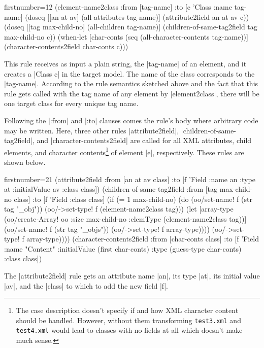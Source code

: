 \documentclass[submission]{eptcs}
\newcommand{\code}{\clojureinline}
\begin{document}
\begin{clojurecode*}{firstnumber=12}
  (element-name2class
   :from [tag-name]
   :to   [c 'Class {:name tag-name}]
   (doseq [[an at av] (all-attributes tag-name)]
     (attribute2field an at av c))
   (doseq [[tag max-child-no] (all-children tag-name)]
     (children-of-same-tag2field tag max-child-no c))
   (when-let [char-conts (seq (all-character-contents tag-name))]
     (character-contents2field char-conts c)))
\end{clojurecode*}

This rule receives as input a plain string, the \code|tag-name| of an element,
and it creates a \code|Class c| in the target model.  The name of the class
corresponds to the \code|tag-name|.  According to the rule semantics sketched
above and the fact that this rule gets called with the tag name of any element
by \code|element2class|, there will be one target class for every unique tag
name.

Following the \code|:from| and \code|:to| clauses comes the rule's body where
arbitrary code may be written.  Here, three other rules \code|attribute2field|,
\code|children-of-same-tag2field|, and \code|character-contents2field| are
called for all XML attributes, child elements, and character
contents\footnote{The case description doesn't specify if and how XML character
  content should be handled.  However, without them transforming
  \texttt{test3.xml} and \texttt{test4.xml} would lead to classes with no
  fields at all which doesn't make much sense.}  of element \code|e|,
respectively.  These rules are shown below.

\begin{clojurecode*}{firstnumber=21}
  (attribute2field
   :from [an at av class]
   :to   [f 'Field {:name an :type at :initialValue av :class class}])
  (children-of-same-tag2field
   :from [tag max-child-no class]
   :to   [f 'Field {:class class}]
   (if (= 1 max-child-no)
     (do (oo/set-name! f (str tag "_obj"))
         (oo/->set-type! f (element-name2class tag)))
     (let [array-type (oo/create-Array! oo :size max-child-no :elemType (element-name2class tag))]
       (oo/set-name! f (str tag "_objs"))
       (oo/->set-type! f array-type))))
       (oo/->set-type! f array-type))))
  (character-contents2field
   :from [char-conts class]
   :to   [f 'Field {:name "Content" :initialValue (first char-conts)
                    :type (guess-type char-conts) :class class}])
\end{clojurecode*}

The \code|attribute2field| rule gets an attribute name \code|an|, its type
\code|at|, its initial value \code|av|, and the \code|class| to which to add
the new field \code|f|.
\end{document}
